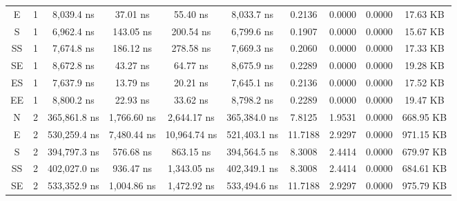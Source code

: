 \begin{sidewaystable}
\begin{tabular}{|c|c|c|c|c|c|c|c|c|c|}
        E       &   1       &   8,039.4 ns            &   37.01 ns          &   55.40 ns              &   8,033.7 ns            &   0.2136      &   0.0000      &   0.0000      &   17.63 KB         \\
        S       &   1       &   6,962.4 ns            &   143.05 ns         &   200.54 ns             &   6,799.6 ns            &   0.1907      &   0.0000      &   0.0000      &   15.67 KB         \\
        SS      &   1       &   7,674.8 ns            &   186.12 ns         &   278.58 ns             &   7,669.3 ns            &   0.2060      &   0.0000      &   0.0000      &   17.33 KB         \\
        SE      &   1       &   8,672.8 ns            &   43.27 ns          &   64.77 ns              &   8,675.9 ns            &   0.2289      &   0.0000      &   0.0000      &   19.28 KB         \\
        ES      &   1       &   7,637.9 ns            &   13.79 ns          &   20.21 ns              &   7,645.1 ns            &   0.2136      &   0.0000      &   0.0000      &   17.52 KB         \\
        EE      &   1       &   8,800.2 ns            &   22.93 ns          &   33.62 ns              &   8,798.2 ns            &   0.2289      &   0.0000      &   0.0000      &   19.47 KB         \\
        N       &   2       &   365,861.8 ns          &   1,766.60 ns       &   2,644.17 ns           &   365,384.0 ns          &   7.8125      &   1.9531      &   0.0000      &   668.95 KB        \\
        E       &   2       &   530,259.4 ns          &   7,480.44 ns       &   10,964.74 ns          &   521,403.1 ns          &   11.7188     &   2.9297      &   0.0000      &   971.15 KB        \\
        S       &   2       &   394,797.3 ns          &   576.68 ns          &   863.15 ns             &   394,564.5 ns          &   8.3008      &   2.4414      &   0.0000      &   679.97 KB        \\
        SS      &   2       &   402,027.0 ns          &   936.47 ns          &   1,343.05 ns           &   402,349.1 ns          &   8.3008      &   2.4414      &   0.0000      &   684.61 KB        \\
        SE      &   2       &   533,352.9 ns          &   1,004.86 ns       &   1,472.92 ns           &   533,494.6 ns          &   11.7188     &   2.9297      &   0.0000      &   975.79 KB        \\

\end{tabular}
\end{sidewaystable}
